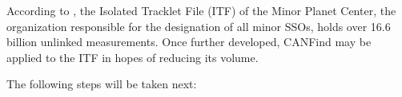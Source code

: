 \documentclass[twocolumn]{aastex62}
\begin{document}
According to \cite{weryk20}, the Isolated Tracklet File (ITF) of the Minor Planet Center, the organization responsible for the designation of all minor SSOs, holds over 16.6 billion unlinked measurements. Once further developed, CANFind may be applied to the ITF in hopes of reducing its volume.

The following steps will be taken next:



\end{document}
